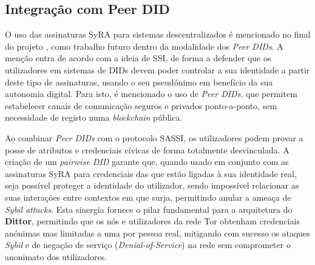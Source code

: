\subsection{Integração com Peer DID}

O uso das assinaturas SyRA para sistemas descentralizados é mencionado no final do projeto \cite{crites2025syra}, como trabalho futuro dentro da modalidade dos \textit{Peer DIDs}. A menção entra de acordo com a ideia de SSI, de forma a defender que os utilizadores em sistemas de DIDs devem poder controlar a sua identidade a partir deste tipo de assinaturas, usando o seu pseudónimo em benefício da sua autonomia digital. Para isto, é mencionado o uso de \textit{Peer DIDs}, que permitem estabelecer canais de comunicação seguros e privados ponto-a-ponto, sem necessidade de registo numa \textit{blockchain} pública.

Ao combinar \textit{Peer DIDs} com o protocolo SASSI, os utilizadores podem provar a posse de atributos e credenciais cívicas de forma totalmente desvinculada. A criação de um \textit{pairwise DID} garante que, quando usado em conjunto com as assinaturas SyRA para credenciais das que estão ligadas à sua identidade real, seja possível proteger a identidade do utilizador, sendo impossível relacionar as suas interações entre contextos em que surja, permitindo anular a ameaça de \textit{Sybil attacks}. Esta sinergia fornece o pilar fundamental para a arquitetura do \textbf{Dittor}, permitindo que os nós e utilizadores da rede Tor obtenham credenciais anónimas mas limitadas a uma por pessoa real, mitigando com sucesso os ataques \textit{Sybil} e de negação de serviço (\textit{Denial-of-Service}) na rede sem comprometer o anonimato dos utilizadores.